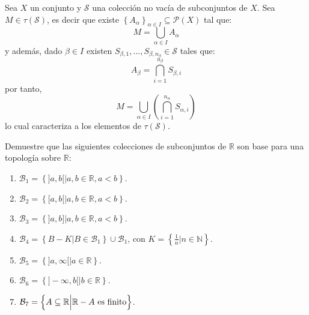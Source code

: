 \documentclass[12pt]{report}
\theoremstyle{largebreak}
\begin{document}
    \begin{obs}
        Sea $X$ un conjunto y $\mathcal{S}$ una colección no vacía de subconjuntos de $X$. Sea $M\in\tau(\mathcal{S})$, es decir que existe $\left\{A_\alpha \right\}_{\alpha\in I } \subseteq\mathcal{P}(X)$ tal que:
        \begin{equation*}
            M=\bigcup_{\alpha\in I}A_\alpha
        \end{equation*}
        y además, dado $\beta\in I$ existen $S_{\beta,1},...,S_{\beta,n_\beta}\in\mathcal{S}$ tales que:
        \begin{equation*}
            A_\beta=\bigcap_{i=1 }^{n_\beta }S_{\beta,i}
        \end{equation*}
        por tanto,
        \begin{equation*}
            M=\bigcup_{\alpha\in I}\left(\bigcap_{i=1 }^{n_\alpha }S_{\alpha,i} \right)
        \end{equation*}
        lo cual caracteriza a los elementos de $\tau(\mathcal{S})$.
    \end{obs}

    \begin{excer}
        Demuestre que las siguientes colecciones de subconjuntos de $\mathbb{R}$ son base para una topología sobre $\mathbb{R}$:
        \begin{enumerate}
            \item $\mathcal{B}_1=\left\{]a,b[\Big|a,b\in\mathbb{R},a<b \right\}$.
            \item $\mathcal{B}_2=\left\{[a,b[\Big|a,b\in\mathbb{R},a<b \right\}$.
            \item $\mathcal{B}_3=\left\{]a,b]\Big|a,b\in\mathbb{R},a<b \right\}$.
            \item  $\mathcal{B}_4=\left\{B-K \Big|B\in\mathcal{B}_1 \right\}\cup\mathcal{B}_1$, con $K=\left\{\frac{1}{n}\Big|n\in\mathbb{N} \right\}$.
            \item $\mathcal{B}_5=\left\{]a,\infty[\Big|a\in\mathbb{R}\right\}$.
            \item $\mathcal{B}_6=\left\{]-\infty,b[\Big|b\in\mathbb{R} \right\}$.
            \item $\mathcal{B}_7=\left\{A\subseteq\mathbb{R}\Big| \mathbb{R}-A\textup{ es finito} \right\}$.
        \end{enumerate}
    \end{excer}
\end{document}

